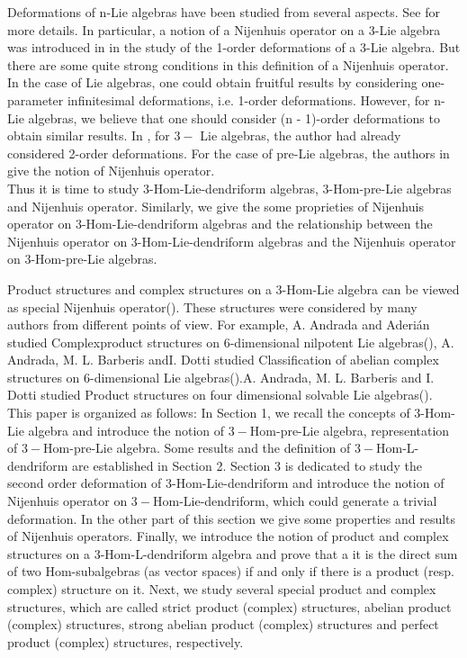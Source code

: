 \documentclass[a4paper,11pt]{article}
\theoremstyle{definition}
\begin{document}
Deformations of n-Lie algebras have been studied from several aspects. See \cite{Azcrraga&Izquierdo,Figueroa}
for more details. In particular, a notion of a Nijenhuis operator on a 3-Lie algebra was
introduced in \cite{Zhang} in the study of the 1-order deformations of a 3-Lie algebra. But there
are some quite strong conditions in this definition of a Nijenhuis operator. In the case of
Lie algebras, one could obtain fruitful results by considering one-parameter infinitesimal
deformations, i.e. 1-order deformations. However, for n-Lie algebras, we believe that
one should consider (n - 1)-order deformations to obtain similar results. In \cite{Figueroa}, for $3-$
Lie algebras, the author had already considered 2-order deformations. For the case of pre-Lie algebras, the authors in \cite{Wang&Sheng&Bai&Liu} give the notion of Nijenhuis operator.\\
Thus it is time to study $3$-Hom-Lie-dendriform algebras, $3$-Hom-pre-Lie algebras and Nijenhuis operator. Similarly, we give the some proprieties of Nijenhuis operator on $3$-Hom-Lie-dendriform algebras and the relationship between the Nijenhuis operator on $3$-Hom-Lie-dendriform algebras and the Nijenhuis operator on $3$-Hom-pre-Lie algebras.

Product structures and complex structures on a $3$-Hom-Lie algebra
can be viewed as special Nijenhuis operator(\cite{ShengTang}).  These structures were considered by many authors from different points of view.  For example, A. Andrada and Aderi\'an studied Complexproduct structures on $6$-dimensional nilpotent Lie algebras(\cite{Andrada3}), A. Andrada, M. L. Barberis andI. Dotti studied Classification of abelian complex structures on $6$-dimensional Lie algebras(\cite{Andrada1}).A. Andrada, M. L. Barberis and I. Dotti studied Product structures on four dimensional solvable Lie algebras(\cite{Andrada2}).
\\
This paper is organized as follows: In Section 1, we recall the concepts of 3-Hom-Lie algebra and introduce the notion of $3-$Hom-pre-Lie algebra, representation of $3-$Hom-pre-Lie algebra. Some results and the definition of $3-$Hom-L-dendriform  are established
in Section 2. Section 3 is  dedicated to study the second order deformation of $3$-Hom-Lie-dendriform and introduce the
notion of Nijenhuis operator on $3-$Hom-Lie-dendriform, which could generate a trivial deformation. In the other part of this section we give some properties and results of Nijenhuis operators. Finally, we introduce the notion of
product and complex structures on a $3$-Hom-L-dendriform algebra and prove that a
it is the direct sum of two Hom-subalgebras (as vector spaces) if and only if there is a
product (resp. complex) structure on it. Next, we study several special product and
complex structures, which are called
strict product (complex) structures, abelian product (complex) structures,
strong abelian product (complex) structures and
perfect product (complex) structures, respectively.
\end{document}
